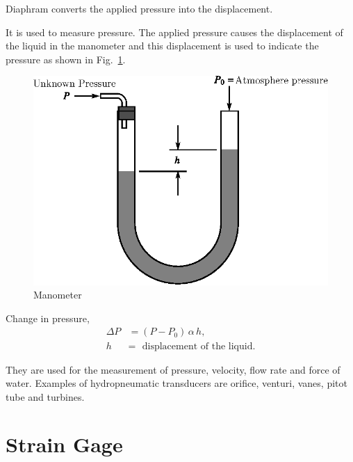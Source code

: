 \eject

 Diaphram converts the applied pressure into the displacement.

\smallskip

 It is used to measure pressure. The applied pressure causes the displacement of the liquid in the manometer and this displacement is used to indicate the pressure as shown in Fig.~\ref{fig8.6}.
\begin{figure}[H]
\centering
\includegraphics{chap8/fig8.6.eps}
\caption{Manometer}\label{fig8.6}
\end{figure}
Change in pressure, 
\begin{align*}
\Delta P &=(P-P_{0})\,\alpha\, h,\\
h &=\text{~ displacement of the liquid.}
\end{align*}

 They are used for the measurement of pressure, velocity, flow rate and force of water. Examples of hydropneumatic transducers are orifice, venturi, vanes, pitot tube and turbines. 

\section{Strain Gage}\label{sec8.6}

